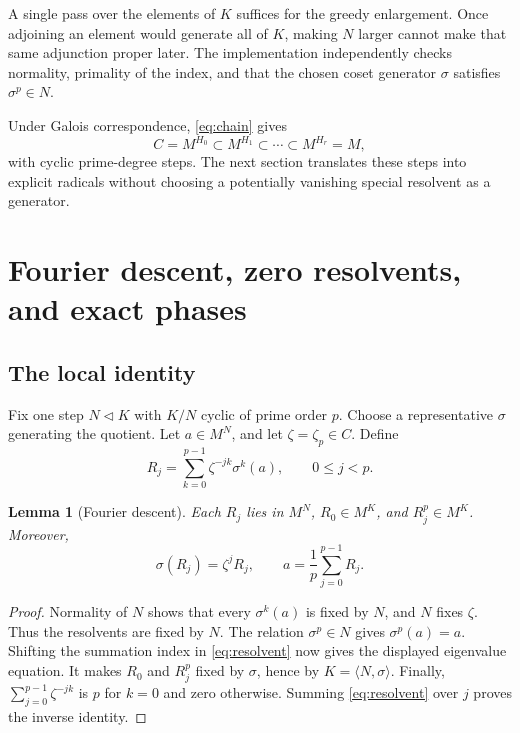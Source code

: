 \documentclass[11pt,letterpaper]{article}
\newtheorem{lemma}[theorem]{Lemma}
\theoremstyle{definition}\newtheorem{definition}[theorem]{Definition}
\theoremstyle{remark}\newtheorem{remark}[theorem]{Remark}
\begin{document}
A single pass over the elements of \(K\) suffices for the greedy enlargement.
Once adjoining an element would generate all of \(K\), making \(N\) larger
cannot make that same adjunction proper later. The implementation independently
checks normality, primality of the index, and that the chosen coset generator
\(\sigma\) satisfies \(\sigma^{p}\in N\).

Under Galois correspondence, \eqref{eq:chain} gives
\[
       C=M^{H_0}\subset M^{H_1}\subset\cdots\subset M^{H_r}=M,
\]
with cyclic prime-degree steps. The next section translates these steps
into explicit radicals without choosing a potentially vanishing special
resolvent as a generator.

\section{Fourier descent, zero resolvents, and exact phases}
\label{sec:fourier}

\subsection{The local identity}

Fix one step \(N\triangleleft K\) with \(K/N\) cyclic of prime order \(p\).
Choose a representative \(\sigma\) generating the quotient. Let
\(a\in M^N\), and let \(\zeta=\zeta_p\in C\). Define
\begin{equation}
       R_j=\sum_{k=0}^{p-1}\zeta^{-jk}\sigma^k(a),
       \qquad 0\leq j<p.                                    \label{eq:resolvent}
\end{equation}

\begin{lemma}[Fourier descent]
Each \(R_j\) lies in \(M^N\), \(R_0\in M^K\), and \(R_j^p\in M^K\).
Moreover,
\begin{equation}
       \sigma(R_j)=\zeta^jR_j,
       \qquad a=\frac1p\sum_{j=0}^{p-1}R_j.                  \label{eq:Fourierinverse}
\end{equation}
\end{lemma}
\begin{proof}
Normality of \(N\) shows that every \(\sigma^k(a)\) is fixed by \(N\),
and \(N\) fixes \(\zeta\). Thus the resolvents are fixed by \(N\).
The relation \(\sigma^p\in N\) gives \(\sigma^p(a)=a\).
Shifting the summation index in \eqref{eq:resolvent} now gives the displayed
eigenvalue equation. It makes \(R_0\) and \(R_j^p\) fixed by \(\sigma\),
hence by \(K=\langle N,\sigma\rangle\). Finally,
\(\sum_{j=0}^{p-1}\zeta^{-jk}\) is \(p\) for \(k=0\) and zero otherwise.
Summing \eqref{eq:resolvent} over \(j\) proves the inverse identity.
\end{proof}
\end{document}
